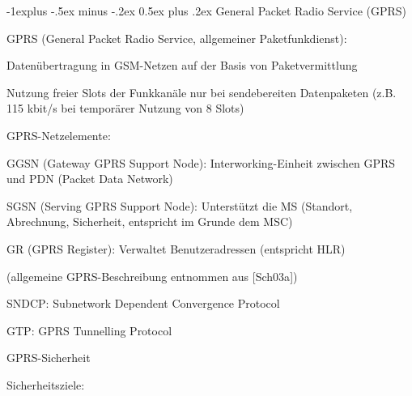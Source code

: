 \documentclass[a4paper]{article}
\makeatletter
\renewcommand{\subsection}{\@startsection{subsection}{2}{0mm}%
 {-1explus -.5ex minus -.2ex}%
 {0.5ex plus .2ex}%
 {\normalfont\normalsize\bfseries}}
\makeatother
\begin{document}
\begin{multicols}{3}
      \subsection{General Packet Radio Service
            (GPRS)}

      \begin{itemize*}
            \item
            GPRS (General Packet Radio Service, allgemeiner Paketfunkdienst):

            \begin{itemize*}
                  \item Datenübertragung in GSM-Netzen auf der Basis von Paketvermittlung
                  \item Nutzung freier Slots der Funkkanäle nur bei sendebereiten Datenpaketen (z.B. 115 kbit/s bei temporärer Nutzung von 8 Slots)
            \end{itemize*}
            \item
            GPRS-Netzelemente:

            \begin{itemize*}
                  \item GGSN (Gateway GPRS Support Node): Interworking-Einheit zwischen GPRS und PDN (Packet Data Network)
                  \item SGSN (Serving GPRS Support Node): Unterstützt die MS (Standort, Abrechnung, Sicherheit, entspricht im Grunde dem MSC)
                  \item GR (GPRS Register): Verwaltet Benutzeradressen (entspricht HLR)
            \end{itemize*}
      \end{itemize*}

      (allgemeine GPRS-Beschreibung entnommen aus {[}Sch03a{]})



      \begin{itemize*}
            \item
            SNDCP: Subnetwork Dependent Convergence Protocol
            \item
            GTP: GPRS Tunnelling Protocol
      \end{itemize*}

      GPRS-Sicherheit

      \begin{itemize*}
            \item
            Sicherheitsziele:


\end{itemize*}
\end{multicols}
\end{document}
